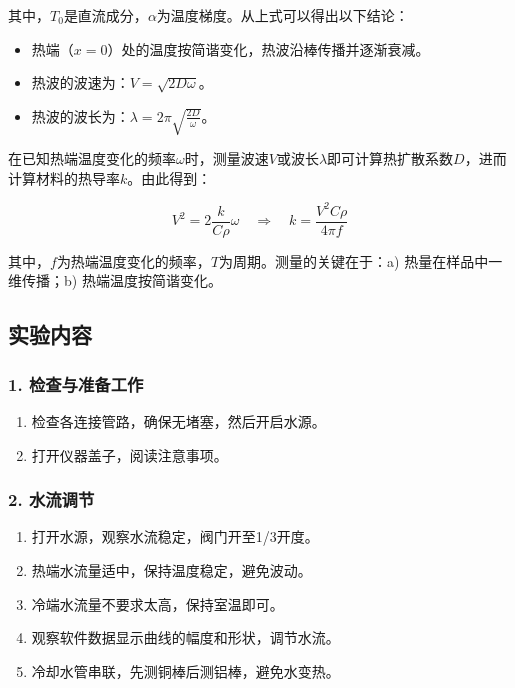 \documentclass[zihao=5, UTF8]{article}
\theoremstyle{MyLineTheoremStyle} %
\theoremstyle{MyBlockTheoremStyle} %
\theoremstyle{MySubsubsectionStyle} %
\begin{document}
其中，$T_0$是直流成分，$\alpha$为温度梯度。从上式可以得出以下结论：

\begin{itemize}
    \item 热端（$x=0$）处的温度按简谐变化，热波沿棒传播并逐渐衰减。
    \item 热波的波速为：$V = \sqrt{2D \omega}$。
    \item 热波的波长为：$\lambda = 2\pi \sqrt{\frac{2D}{\omega}}$。
\end{itemize}

在已知热端温度变化的频率$\omega$时，测量波速$V$或波长$\lambda$即可计算热扩散系数$D$，进而计算材料的热导率$k$。由此得到：

\begin{equation}
V^2 = 2 \frac{k}{C \rho} \omega \quad \Rightarrow \quad k = \frac{V^2 C \rho}{4 \pi f}
\end{equation}

其中，$f$为热端温度变化的频率，$T$为周期。测量的关键在于：a) 热量在样品中一维传播；b) 热端温度按简谐变化。

\subsection{实验内容}

\subsubsection*{1. 检查与准备工作}
\begin{enumerate}
    \item 检查各连接管路，确保无堵塞，然后开启水源。
    \item 打开仪器盖子，阅读注意事项。
\end{enumerate}

\subsubsection*{2. 水流调节}
\begin{enumerate}
    \item 打开水源，观察水流稳定，阀门开至1/3开度。
    \item 热端水流量适中，保持温度稳定，避免波动。
    \item 冷端水流量不要求太高，保持室温即可。
    \item 观察软件数据显示曲线的幅度和形状，调节水流。
    \item 冷却水管串联，先测铜棒后测铝棒，避免水变热。
\end{enumerate}
\end{document}
